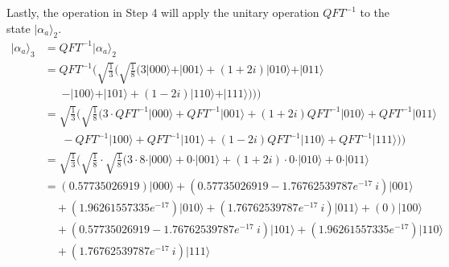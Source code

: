 \begin{example}
Lastly, the operation in Step 4 will apply the unitary operation $QFT^{-1}$ to the state $\vert \alpha_{a} \rangle_2$.
	\begin{align*}
		\vert \alpha_{a} \rangle_3 &= QFT^{-1}\vert \alpha_{a} \rangle_2 \\
		&= QFT^{-1} \bigg( \sqrt{\frac{1}{3}} \bigg( \sqrt{\frac{1}{8}} \Big( 3\vert 000 \rangle + \vert 001 \rangle + \left( 1+2i \right) \vert 010 \rangle + \vert 011 \rangle \\
		&\ \ \ \ \ \ \ - \vert 100 \rangle + \vert 101 \rangle + \left( 1-2i \right) \vert 110 \rangle + \vert 111 \rangle \Big) \bigg) \bigg) \\
		&= \sqrt{\frac{1}{3}} \bigg( \sqrt{\frac{1}{8}} \Big( 3 \cdot QFT^{-1}\vert 000 \rangle + QFT^{-1}\vert 001 \rangle + \left( 1+2i \right) QFT^{-1}\vert 010 \rangle + QFT^{-1}\vert 011 \rangle \\
		&\ \ \ \ \ \ \ - QFT^{-1}\vert 100 \rangle + QFT^{-1}\vert 101 \rangle + \left( 1-2i \right) QFT^{-1}\vert 110 \rangle + QFT^{-1}\vert 111 \rangle \Big) \bigg) \\
		&= \sqrt{\frac{1}{3}} \bigg( \sqrt{\frac{1}{8}} \cdot \sqrt{\frac{1}{8}} \Big( 3 \cdot 8 \cdot \vert 000 \rangle + 0 \cdot \vert 001 \rangle + \left( 1+2i \right) \cdot 0 \cdot \vert 010 \rangle + 0 \cdot \vert 011 \rangle \\
		&=  (0.57735026919) \vert 000 \rangle + (0.57735026919 - 1.76762539787e^{-17}\ i) \vert 001 \rangle \\
		& \quad + (1.96261557335e^{-17}) \vert 010 \rangle + (1.76762539787e^{-17}\ i) \vert 011\rangle + (0) \vert 100 \rangle \\
		& \quad + (0.57735026919 - 1.76762539787e^{-17}\ i) \vert 101 \rangle + (1.96261557335e^{- 17}) \vert 110 \rangle \\
		& \quad + (1.76762539787e^{-17}\ i) \vert 111 \rangle
	\end{align*}

\end{example}
